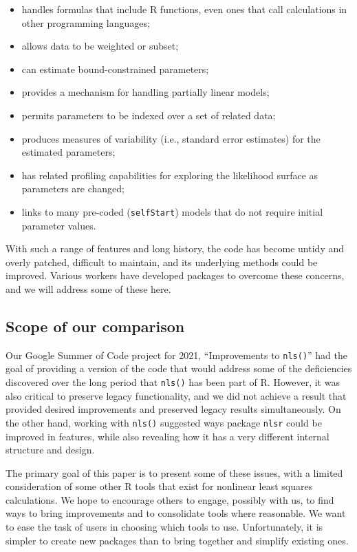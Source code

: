 \documentclass[
]{article}
\providecommand{\tightlist}{%
  \setlength{\itemsep}{0pt}\setlength{\parskip}{0pt}}
\begin{document}
\begin{itemize}
\tightlist
\item
  handles formulas that include R functions, even ones that call
  calculations in other programming languages;
\item
  allows data to be weighted or subset;
\item
  can estimate bound-constrained parameters;
\item
  provides a mechanism for handling partially linear models;
\item
  permits parameters to be indexed over a set of related data;
\item
  produces measures of variability (i.e., standard error estimates) for
  the estimated parameters;
\item
  has related profiling capabilities for exploring the likelihood
  surface as parameters are changed;
\item
  links to many pre-coded (\texttt{selfStart}) models that do not
  require initial parameter values.
\end{itemize}

With such a range of features and long history, the code has become
untidy and overly patched, difficult to maintain, and its underlying
methods could be improved. Various workers have developed packages to
overcome these concerns, and we will address some of these here.

\hypertarget{scope-of-our-comparison}{%
\subsection{Scope of our comparison}\label{scope-of-our-comparison}}

Our Google Summer of Code project for 2021, ``Improvements to
\texttt{nls()}'' had the goal of providing a version of the code that
would address some of the deficiencies discovered over the long period
that \texttt{nls()} has been part of R. However, it was also critical to
preserve legacy functionality, and we did not achieve a result that
provided desired improvements and preserved legacy results
simultaneously. On the other hand, working with \texttt{nls()} suggested
ways package \texttt{nlsr} could be improved in features, while also
revealing how it has a very different internal structure and design.

The primary goal of this paper is to present some of these issues, with
a limited consideration of some other R tools that exist for nonlinear
least squares calculations. We hope to encourage others to engage,
possibly with us, to find ways to bring improvements and to consolidate
tools where reasonable. We want to ease the task of users in choosing
which tools to use. Unfortunately, it is simpler to create new packages
than to bring together and simplify existing ones.
\end{document}
